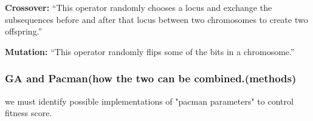 \textbf{Crossover:} \enquote{This operator randomly chooses a locus and exchange the subsequences before and after that locus between two chromosomes to create two offspring.} \cite[pp. 8]{Melanie1990}


\textbf{Mutation:} \enquote{This operator randomly flips some of the bits in a chromosome.} \cite[pp. 8]{Melanie1990}




\subsubsection{GA and Pacman(how the two can be combined.(methods)}
we must identify possible implementations of "pacman parameters" to control fitness score.
